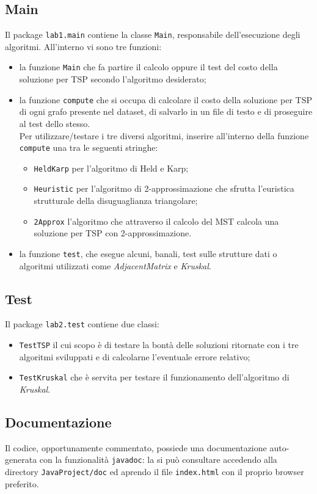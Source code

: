 \subsection{Main}
Il package \texttt{lab1.main} contiene la classe \texttt{Main}, responsabile dell'esecuzione degli algoritmi. All'interno vi sono tre funzioni:
\begin{itemize}
	\item la funzione \texttt{Main} che fa partire il calcolo oppure il test del costo della soluzione per TSP secondo l'algoritmo desiderato;
	\item la funzione \texttt{compute} che si occupa di calcolare il costo della soluzione per TSP di ogni grafo presente nel dataset, di salvarlo in un file di testo e di proseguire al test dello stesso.\\
	Per utilizzare/testare i tre diversi algoritmi, inserire all'interno della funzione \texttt{compute} una tra le seguenti stringhe:
	\begin{itemize}
		\item \texttt{HeldKarp} per l'algoritmo di Held e Karp;
		\item \texttt{Heuristic} per l'algoritmo di 2-approssimazione che sfrutta l'euristica strutturale della disuguaglianza triangolare;
		\item \texttt{2Approx} l'algoritmo che attraverso il calcolo del MST calcola una soluzione per TSP con 2-approssimazione.
	\end{itemize}
    \item la funzione \texttt{test}, che esegue alcuni, banali, test sulle strutture dati o algoritmi utilizzati come \textit{AdjacentMatrix} e \textit{Kruskal}.
\end{itemize}

\subsection{Test}
Il package \texttt{lab2.test} contiene due classi:
\begin{itemize}
	\item \texttt{TestTSP} il cui scopo è di testare la bontà delle soluzioni ritornate con i tre algoritmi sviluppati e di calcolarne l'eventuale errore relativo;
	\item \texttt{TestKruskal} che è servita per testare il funzionamento dell'algoritmo di \textit{Kruskal}.
\end{itemize}

\subsection{Documentazione}
Il codice, opportunamente commentato, possiede una documentazione auto-generata con la funzionalità \texttt{javadoc}: la si può consultare accedendo alla directory \texttt{JavaProject/doc} ed aprendo il file \texttt{index.html} con il proprio browser preferito. 
